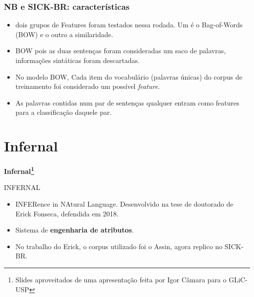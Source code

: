 \documentclass{beamer}
\begin{document}
\begin{frame}
\frametitle{NB e SICK-BR: características}
\begin{itemize}
	\item dois grupos de Features foram testados nessa rodada. Um é o Bag-of-Words (BOW) e o outro a similaridade.\\
	\item BOW pois as duas sentenças foram consideradas um saco de palavras, informações sintáticas foram descartadas.\\
	\item No modelo BOW, Cada item do vocabulário (palavras únicas) do corpus de treinamento foi considerado um possível \textit{feature}.\\
	\item As palavras contidas num par de sentenças qualquer entram como features para a classificação daquele par.\\
	
\end{itemize}
\end{frame}

\section{Infernal}
	\begin{frame}
\centering \textbf{Infernal\footnote{Slides aproveitados de uma apresentação feita por Igor Câmara para o GLiC-USP}\\}
\end{frame}
\begin{frame}[fragile]{INFERNAL}
\begin{itemize}
	\item INFERence in NAtural Language. Desenvolvido na tese de doutorado de Erick Fonseca, defendida em 2018.\\
	\item Sistema de \textbf{engenharia de atributos}.\\
	\item No trabalho do Erick, o corpus utilizado foi o Assin, agora replico no SICK-BR.\\
\end{itemize}
\end{frame}
\end{document}
